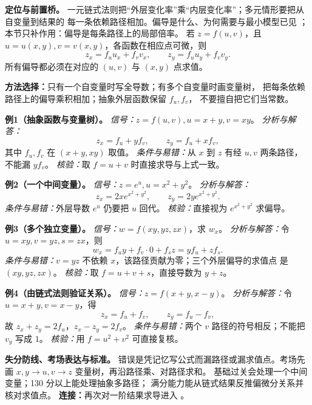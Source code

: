 
\begin{knowledgeBox}
\textbf{定位与前置桥。}
一元链式法则把“外层变化率”乘“内层变化率”；多元情形要把从自变量到结果的
每一条依赖路径相加。偏导是什么、为何需要与最小模型已见
；本节只补作用：偏导是每条路径上的局部倍率。
若 \(z=f(u,v)\)，且 \(u=u(x,y),v=v(x,y)\)，各函数在相应点可微，则
\[
z_x=f_u u_x+f_v v_x,\qquad z_y=f_u u_y+f_v v_y.
\]
所有偏导都必须在对应的 \((u,v)\) 与 \((x,y)\) 点求值。

\textbf{方法选择：}只有一个自变量时写全导数；有多个自变量时画变量树，
把每条依赖路径上的偏导乘积相加；抽象外层函数保留 \(f_u,f_v\)，
不要擅自把它们当常数。

\textbf{例1（抽象函数与变量树）。}
\emph{信号：}\(z=f(u,v),u=x+y,v=xy\)。
\emph{分析与解答：}
\[
z_x=f_u+yf_v,\qquad z_y=f_u+xf_v,
\]
其中 \(f_u,f_v\) 在 \((x+y,xy)\) 取值。
\emph{条件与易错：}从 \(x\) 到 \(z\) 有经 \(u,v\) 两条路径，不能漏 \(yf_v\)。
\emph{核验：}取 \(f=u+v\) 时直接求导与上式一致。

\textbf{例2（一个中间变量）。}
\emph{信号：}\(z=e^u,u=x^2+y^2\)。
\emph{分析与解答：}
\[
z_x=2xe^{x^2+y^2},\qquad z_y=2ye^{x^2+y^2}.
\]
\emph{条件与易错：}外层导数 \(e^u\) 仍要把 \(u\) 回代。
\emph{核验：}直接视为 \(e^{x^2+y^2}\) 求偏导。

\textbf{例3（多个独立变量）。}
\emph{信号：}\(w=f(xy,yz,zx)\)，求 \(w_x\)。
\emph{分析与解答：}令 \(u=xy,v=yz,s=zx\)，则
\[
w_x=f_u y+f_v\cdot0+f_s z=yf_u+zf_s.
\]
\emph{条件与易错：}\(v=yz\) 不依赖 \(x\)，该路径贡献为零；三个外层偏导的求值点
是 \((xy,yz,zx)\)。
\emph{核验：}取 \(f=u+v+s\)，直接导数为 \(y+z\)。

\textbf{例4（由链式法则验证关系）。}
\emph{信号：}\(z=f(x+y,x-y)\)。
\emph{分析与解答：}令 \(u=x+y,v=x-y\)，得
\[
z_x=f_u+f_v,\qquad z_y=f_u-f_v,
\]
故 \(z_x+z_y=2f_u\)，\(z_x-z_y=2f_v\)。
\emph{条件与易错：}两个 \(v\) 路径的符号相反；不能把 \(v_y\) 写成 \(1\)。
\emph{核验：}用 \(f=u^2+v^2\) 可直接复核。

\textbf{失分防线、考场表达与标准。}
错误是凭记忆写公式而漏路径或漏求值点。考场先画
\(x,y\to u,v\to z\) 变量树，再沿路径乘、对路径求和。
基础过关会处理一个中间变量；130 分以上能处理抽象多路径；
满分能力能从链式结果反推偏微分关系并核对求值点。
\textbf{连接：}再次对一阶结果求导进入
。
\end{knowledgeBox}

